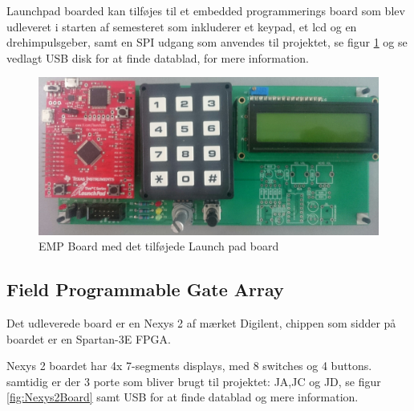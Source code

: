 Launchpad boarded kan tilføjes til et embedded programmerings board som blev udleveret i starten af semesteret som inkluderer et keypad, et lcd og en drehimpulsgeber, samt en SPI udgang som anvendes til projektet, se figur \ref{fig:EMP_BOARD} og se vedlagt USB disk for at finde datablad, for mere information.

\begin{figure}[!ht]
	\begin{center}
		\includegraphics[scale=0.1, angle =0]{Billeder/EMP_BOARD.JPG}
	\end{center}
\caption{EMP Board med det tilføjede Launch pad board}
\label{fig:EMP_BOARD}
\end{figure}

\subsection{Field Programmable Gate Array}

Det udleverede board er en Nexys 2 af mærket Digilent, chippen som sidder på boardet er en Spartan-3E FPGA.

Nexys 2 boardet har 4x 7-segments displays, med 8 switches og 4 buttons. samtidig er der 3 porte som bliver brugt til projektet: JA,JC og JD, se figur \ref{fig:Nexys2Board} samt USB for at finde datablad og mere information.

